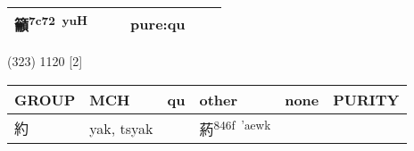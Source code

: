 \documentclass[14pt,a4paper]{scrartcl}
\begin{document}
\begin{longtable}[c]{@{}llllll@{}}
\begin{minipage}[t]{0.14\columnwidth}\raggedright\strut
籲\textsuperscript{7c72~yuH}
\strut\end{minipage} &
\begin{minipage}[t]{0.14\columnwidth}\raggedright\strut
\strut\end{minipage} &
\begin{minipage}[t]{0.14\columnwidth}\raggedright\strut
\strut\end{minipage} &
\begin{minipage}[t]{0.14\columnwidth}\raggedright\strut
pure:qu
\strut\end{minipage}\tabularnewline
\bottomrule
\end{longtable}

(323) 1120 {[}2{]}

\begin{longtable}[c]{@{}llllll@{}}
\toprule
\begin{minipage}[b]{0.14\columnwidth}\raggedright\strut
GROUP
\strut\end{minipage} &
\begin{minipage}[b]{0.14\columnwidth}\raggedright\strut
MCH
\strut\end{minipage} &
\begin{minipage}[b]{0.14\columnwidth}\raggedright\strut
qu
\strut\end{minipage} &
\begin{minipage}[b]{0.14\columnwidth}\raggedright\strut
other
\strut\end{minipage} &
\begin{minipage}[b]{0.14\columnwidth}\raggedright\strut
none
\strut\end{minipage} &
\begin{minipage}[b]{0.14\columnwidth}\raggedright\strut
PURITY
\strut\end{minipage}\tabularnewline
\midrule
\endhead
\begin{minipage}[t]{0.14\columnwidth}\raggedright\strut
約
\strut\end{minipage} &
\begin{minipage}[t]{0.14\columnwidth}\raggedright\strut
yak, tsyak
\strut\end{minipage} &
\begin{minipage}[t]{0.14\columnwidth}\raggedright\strut
\strut\end{minipage} &
\begin{minipage}[t]{0.14\columnwidth}\raggedright\strut
葯\textsuperscript{846f~'aewk}
\strut\end{minipage} &

\end{longtable}
\end{document}
